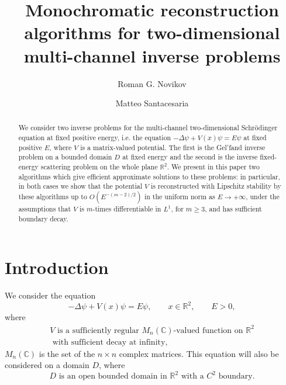 \documentclass[11pt,a4paper,english,subeqn]{amsart}
\theoremstyle{plain}
\theoremstyle{definition}
\numberwithin{equation}{section}
\begin{document}
\title[Monochromatic reconstruction algorithms]{Monochromatic reconstruction algorithms for two-dimensional multi-channel inverse problems}
\author{Roman G. Novikov}
\author{Matteo Santacesaria}
\address[R. G. Novikov and M. Santacesaria]{CNRS (UMR 7641), Centre de Math\'ematiques Appliqu\'ees, \'Ecole Polytechnique, 91128, Palaiseau, France}
\begin{abstract}
We consider two inverse problems for the multi-channel two-dimensional Schr\"odinger equation at fixed positive energy, i.e. the equation $-\Delta \psi + V(x)\psi = E \psi$ at fixed positive $E$, where $V$ is a matrix-valued potential. The first is the Gel'fand inverse problem on a bounded domain $D$ at fixed energy and the second is the inverse fixed-energy scattering problem on the whole plane ${\mathbb{R}}^2$. We present in this paper two algorithms which give efficient approximate solutions to these problems: in particular, in both cases we show that the potential $V$ is reconstructed with Lipschitz stability by these algorithms up to $O(E^{-(m-2)/2})$ in the uniform norm as $E \to +\infty$, under the assumptions that $V$ is $m$-times differentiable in $L^1$, for $m \geq 3$, and has sufficient boundary decay.
\end{abstract}

\maketitle
\section{Introduction}
We consider the equation
\begin{equation} \label{equa}
-\Delta \psi + V(x)\psi = E \psi, \qquad x \in {\mathbb{R}}^2, \qquad E >0,
\end{equation}
where
\begin{gather} \label{assv}
V \text{ is a sufficiently regular ${M_{n}({\mathbb{C}})}$-valued function on } {\mathbb{R}}^2 \\ \nonumber
\text{ with sufficient decay at infinity},
\end{gather}
${M_{n}({\mathbb{C}})}$ is the set of the $n \times n$ complex matrices. This equation will also be considered on a domain $D$, where 
\begin{equation} \label{condd}
D \text{ is an open bounded domain in } {\mathbb{R}}^2 \text{ with a }C^2 \text{ boundary}.
\end{equation}
\end{document}

